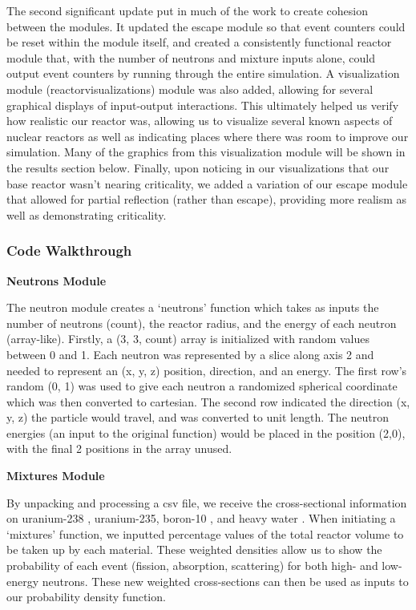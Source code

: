 \documentclass{notes}
\begin{document}
The second significant update put in much of the work to create cohesion between the modules. It updated the escape module so that event counters could be reset within the module itself, and created a consistently functional reactor module that, with the number of neutrons and mixture inputs alone, could output event counters by running through the entire simulation. A visualization module (reactor\textunderscore visualizations) module was also added, allowing for several graphical displays of input-output interactions. This ultimately helped us verify how realistic our reactor was, allowing us to visualize several known aspects of nuclear reactors as well as indicating places where there was room to improve our simulation. Many of the graphics from this visualization module will be shown in the results section below. Finally, upon noticing in our visualizations that our base reactor wasn't nearing criticality, we added a variation of our escape module that allowed for partial reflection (rather than escape), providing more realism as well as demonstrating criticality.

\subsubsection*{Code Walkthrough}

\textbf{Neutrons Module}

The neutron module creates a `neutrons' function which takes as inputs the number of neutrons (count), the reactor radius, and the energy of each neutron (array-like). Firstly, a (3, 3, count) array is initialized with random values between 0 and 1. Each neutron was represented by a slice along axis 2 and needed to represent an (x, y, z) position, direction, and an energy. The first row's random (0, 1) was used to give each neutron a randomized spherical coordinate which was then converted to cartesian. The second row indicated the direction (x, y, z) the particle would travel, and was converted to unit length. The neutron energies (an input to the original function) would be placed in the position (2,0), with the final 2 positions in the array unused.

\textbf{Mixtures Module}

By unpacking and processing a csv file, we receive the cross-sectional information on uranium-238 \cite{Kim, Andersen}, uranium-235, boron-10 \cite{Bogart}, and heavy water \cite{CrossSections}. When initiating a `mixtures' function, we inputted percentage values of the total reactor volume to be taken up by each material. These weighted densities allow us to show the probability of each event (fission, absorption, scattering) for both high- and low-energy neutrons. These new weighted cross-sections can then be used as inputs to our probability density function.
\end{document}
